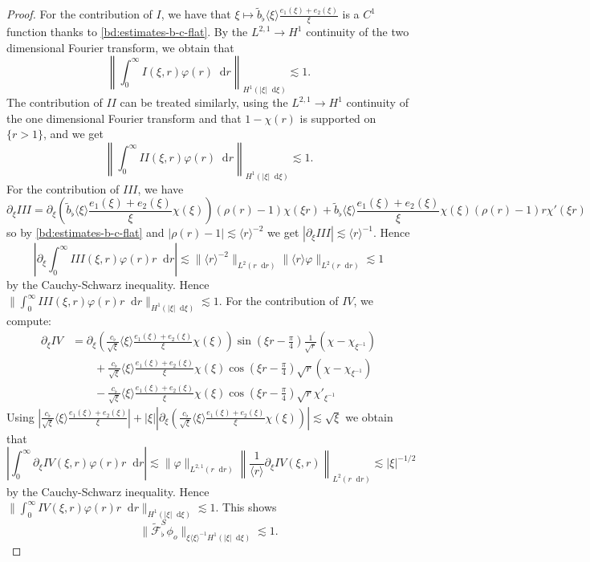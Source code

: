 \documentclass[11 pt]{amsart}
\theoremstyle{definition}
\theoremstyle{remark}
\numberwithin{equation}{section}
\newcommand{\dd}{\mathop{}\!\mathrm{d}}
\begin{document}
\begin{proof}
For the contribution of $I$, we have that $\xi \mapsto \widetilde b_\flat \langle \xi \rangle \frac{e_1(\xi)+e_2(\xi)}{\xi}$ is a $C^1$ function thanks to \eqref{bd:estimates-b-c-flat}. By the $L^{2,1}\to H^1$ continuity of the two dimensional Fourier transform, we obtain that 
$$
\left\| \int_0^\infty I(\xi,r) \varphi(r)\dd r \right\|_{H^1{(|\xi|\dd \xi)}}\lesssim 1.
$$
The contribution of $II$ can be treated similarly, using the $L^{2,1}\to H^1$ continuity of the one dimensional Fourier transform and that $1-\chi (r)$ is supported on $\{r>1\}$, and we get 
$$
\left\| \int_0^\infty II(\xi,r) \varphi(r)\dd r \right\|_{H^1(|\xi|\dd \xi)}\lesssim 1.
$$
For the contribution of $III$, we have
$$
\partial_\xi III=\partial_\xi \left(  \widetilde b_\flat \langle \xi \rangle  \frac{e_1(\xi)+e_2(\xi)}{\xi} \chi(\xi)\right) (\rho(r)-1)\chi(\xi r)+ \widetilde b_\flat \langle \xi \rangle  \frac{e_1(\xi)+e_2(\xi)}{\xi} \chi(\xi) (\rho(r)-1) r \chi'(\xi r)
$$
so by \eqref{bd:estimates-b-c-flat} and $|\rho(r)-1|\lesssim \langle r \rangle^{-2}$ we get $|\partial_\xi III|\lesssim \langle r\rangle ^{-1}$. Hence
$$
\left| \partial_\xi \int_0^\infty III(\xi,r) \varphi(r)r\dd r \right| \lesssim  \|  \langle r \rangle^{-2} \|_{L^2(r \dd r)} \| \langle r \rangle \varphi \|_{L^2(r\dd r)}\lesssim 1
$$
by the Cauchy-Schwarz inequality. Hence $\| \int_0^\infty III(\xi,r) \varphi(r)r\dd r  \|_{H^1(|\xi| \dd \xi)} \lesssim 1$. For the contribution of $IV$, we compute:
\begin{align*}
\partial_\xi IV &= \partial_\xi \left( \frac{c_\flat}{\sqrt{\xi}} \langle \xi \rangle \frac{e_1(\xi)+e_2(\xi)}{\xi}\chi(\xi)\right)   \sin (\xi r-\frac \pi 4) \frac{1}{\sqrt{r}} \left(\chi-\chi_{\xi^{-1}}\right)\\
& \qquad + \frac{c_\flat}{\sqrt{\xi}} \langle \xi \rangle \frac{e_1(\xi)+e_2(\xi)}{\xi}\chi(\xi)  \cos (\xi r-\frac \pi 4) \sqrt{r} \left(\chi-\chi_{\xi^{-1}}\right)\\
& \qquad - \frac{c_\flat}{\sqrt{\xi}} \langle \xi \rangle \frac{e_1(\xi)+e_2(\xi)}{\xi}\chi(\xi)  \cos (\xi r-\frac \pi 4) \sqrt{r} \chi'_{\xi^{-1}}
\end{align*}
Using $| \frac{c_\flat}{\sqrt{\xi}} \langle \xi \rangle \frac{e_1(\xi)+e_2(\xi)}{\xi}|+ |\xi| | \partial_\xi \left( \frac{c_\flat}{\sqrt{\xi}} \langle \xi \rangle \frac{e_1(\xi)+e_2(\xi)}{\xi}\chi(\xi)\right) |\lesssim \sqrt{\xi}$ we obtain that
$$
\left| \int_0^\infty \partial_\xi IV(\xi,r) \varphi(r)r \dd r \right| \lesssim \| \varphi \|_{L^{2,1}(r\dd r)}\left\| \frac{1}{\langle r\rangle }\partial_\xi IV (\xi,r)\right\|_{L^2(r\dd r)}\lesssim |\xi|^{-1/2}
$$
by the Cauchy-Schwarz inequality. Hence $\| \int_0^\infty IV(\xi,r) \varphi(r)r\dd r  \|_{H^1(|\xi| \dd \xi)} \lesssim 1$. This shows 
$$
\| \widetilde {\mathcal F}_\flat^{S} \phi_o \|_{\xi \langle \xi\rangle^{-1}H^1(|\xi|\dd \xi)}\lesssim 1.
$$


\end{proof}
\end{document}
